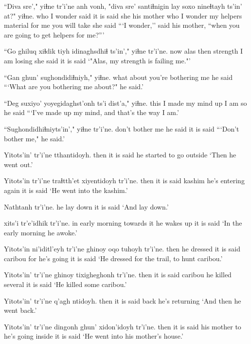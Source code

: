 \documentclass[12pt]{article}
\begin{document}
\gll ``Diva sre'," yiɬne tr'i'ne anh vonh, "diva sre' santiɬnigin lay soxo nineɬtayh ts'in' at?" yiɬne.
who {I wonder} said {it is said} she {his mother} who {I wonder} {my helpers} material {for me} {you will take} {} {} {she said}
\glt ```I wonder,'' said his mother, ``when you are going to get helpers for me?'''
\glend

\gll ``Go ghiluq xiɬdik tiyh  idinaghsdhiɬ ts'in'," yiɬne  tr'i'ne.
now alas then strength {I am losing} {} {she said} {it is said}
\glt `"Alas, my strength is failing me."'
\glend

\gll ``Gan ghun' sughondidiɬniyh,"  yiɬne.
what about {you're bothering me} {he said}
\glt ```What are you bothering me about?" he said.'
\glend

\gll ``Deg {suxiyo' yoyegidaghst'onh} ts'i dist'a," yiɬne.
this {I made my mind up} {} {I am so} {he said}
\glt ```I've made up my mind, and that's the way I am.'
\glend

\gll ``Sughondidhiɬniyts'in'," yiɬne tr'i'ne.
{don't bother me} {he said} {it is said}
\glt ```Don't bother me," he said.'
\glend

\gll Yitots'in' tr'i'ne tthantidoyh.
then  {it is said} {he started to go outside}
\glt `Then he went out.'
\glend

\gll Yitots'in tr'i'ne traɬtth'et xiyentidoyh tr'i'ne.
then  {it is said} kashim {he's entering again} {it is said}
\glt `He went into the kashim.'
\glend

\gll Nathtanh tr'i'ne.
{he lay down} {it is said}
\glt `And lay down.'
\glend

 xits'i tr'e'idhik tr'i'ne.
{in early morning} {towards it} {he wakes up} {it is said}
\glt `In the early morning he awoke.'
\glend

\gll Yitots'in ni'iditl'eyh  tr'i'ne ghinoy oqo tuhoyh tr'i'ne.
then {he dressed} {it is said} caribou  for {he's going}  {it is said}
\glt `He dressed for the trail, to hunt caribou.'
\glend

\gll Yitots'in' tr'i'ne ghinoy tixigheghonh  tr'i'ne.
then  {it is said} caribou {he killed several} {it is said}
\glt `He killed some caribou.'
\glend

\gll Yitots'in' tr'i'ne q'agh ntidoyh.
then  {it is said} back {he's returning}
\glt `And then he went back.'
\glend

\gll Yitots'in' tr'i'ne dingonh ghun'  xidon'idoyh tr'i'ne.
then  {it is said} {his mother} to {he's going inside} {it is said}
\glt `He went into his mother's house.'
\glend
\end{document}
